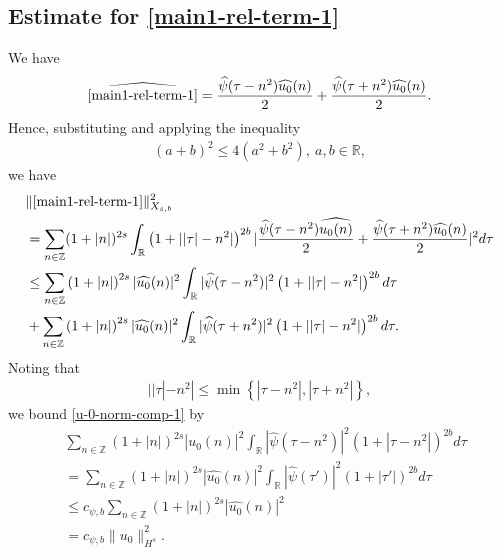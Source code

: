 \documentclass[12pt,reqno]{amsart}
\numberwithin{equation}{section}  %
\newcommand{\rr}{\mathbb{R}}
\newcommand{\zz}{\mathbb{Z}}
\newcommand{\wh}{\widehat}
\begin{document}
\subsection{Estimate for \eqref{main1-rel-term-1}}
\label{ssec:est-init-term-1}
We have
%
%
\begin{equation*}
  \begin{split}
    \wh{\eqref{main1-rel-term-1}}
    = \frac{\wh{\psi}(\tau -
    n^{2})\wh{u_{0}}(n)}{2} + \frac{\wh{\psi}(\tau +
    n^{2})\wh{u_{0}}(n)}{2}.
  \end{split}
\end{equation*}
%
%
Hence, substituting and applying the inequality 
%
%
\begin{equation}
  \label{square-ineq}
\begin{split}
(a + b)^{2} \le 4(a^{2} +
b^{2}),\ a, b \in \rr,
\end{split}
\end{equation}
%
%
we have
%
%
\begin{align}
  & \| \eqref{main1-rel-term-1} \|_{X_{s,b}}^{2} 
    \notag
    \\
    & = \sum_{n \in \zz}(1 + |n|)^{2s} \int_{\rr}\left( 1 + | | \tau
    |-n^{2} | \right)^{2b} | \frac{\wh{\psi}(\tau - n^{2})\wh{u_{0}(n)}}{2 } +
    \frac{\wh{\psi}(\tau + n^{2})\wh{u_{0}}(n)}{2 } |^{2} d \tau
    \notag
    \\
    & \le \sum_{n \in \zz} \left( 1 + |n| \right)^{2s} | \wh{u_{0}}(n)
    |^{2} \int_{\rr} | \wh{\psi}(\tau - n^{2}) |^{2}\left( 1 + | | \tau | -
    n^{2} | \right)^{2b} d \tau
    \label{u-0-norm-comp-1}
    \\
    & + \sum_{n \in \zz} \left( 1 + |n| \right)^{2s} | \wh{u_{0}}(n)
    |^{2} \int_{\rr} | \wh{\psi}(\tau + n^{2}) |^{2}\left( 1 + | | \tau | -
    n^{2} | \right)^{2b} d \tau.
    \label{u-0-norm-comp-3}
\end{align}
%
%
Noting that
\begin{equation}
  \begin{split}
    | | \tau | - n^{2} | \le \min\left\{ | \tau - n^{2} |, | \tau + n^{2} |
    \right\},
  \end{split}
  \label{eqn:norm-key-ineq}
\end{equation}
%
we bound \eqref{u-0-norm-comp-1} by
%
%
\begin{equation*}
  \begin{split}
    & \sum_{n \in \zz} \left( 1 + |n| \right)^{2s} | \wh{u_{0}}(n)
    |^{2} \int_{\rr} | \wh{\psi}(\tau - n^{2}) |^{2}\left( 1 +  | \tau  -
    n^{2} | \right)^{2b} d \tau
    \\
    & = \sum_{n \in \zz} \left( 1 + |n| \right)^{2s} | \wh{u_{0}}(n)
    |^{2} \int_{\rr} | \wh{\psi}(\tau') |^{2}\left( 1 +  | \tau'|
    \right)^{2b} d \tau
    \\
    & \le c_{\psi, b} \sum_{n \in \zz} \left( 1 + |n| \right)^{2s} | \wh{u_{0}}(n)
    |^{2}
    \\
    & = c_{\psi, b} \| u_{0} \|_{H^{s}}^{2}.
  \end{split}
\end{equation*}
\end{document}
